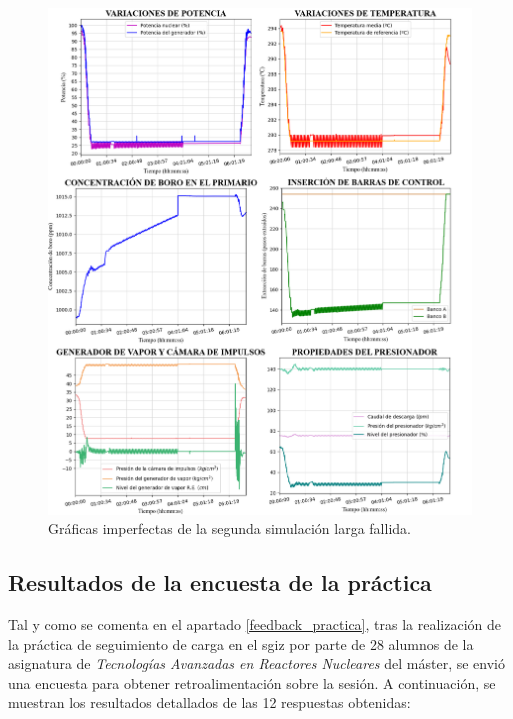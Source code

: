 \begin{figure}[!h]
    \centering
    \includegraphics[width=\textwidth]{content/figures/sim2_peque.png}
    \caption{Gráficas imperfectas de la segunda simulación larga fallida.}
    \label{fig:sim2_peque}
\end{figure}

\newpage
\subsection{Resultados de la encuesta de la práctica} \label{resultados_encuesta_practica}

Tal y como se comenta en el apartado \ref{feedback_practica}, tras la realización de la práctica de seguimiento de carga en el \acrshort{sgiz} por parte de 28 alumnos de la asignatura de \textit{Tecnologías Avanzadas en Reactores Nucleares} del máster, se envió una encuesta para obtener retroalimentación sobre la sesión. A continuación, se muestran los resultados detallados de las 12 respuestas obtenidas:

